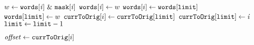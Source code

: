    \item[]
       \label{line:intersect:1}
       \label{line:intersect:2}
        \STATE $w \gets \Words[\localvar{i}] \ \& \ \Mask[\localvar{i}]$  \label{line:intersect:4}
         \label{line:intersect:5}
          \STATE $\texttt{words}[\mathit{i}] \gets w$ \label{line:intersect:6}
           \label{line:intersect:7}
            \STATE $\texttt{words}[i] \gets \texttt{words}[\texttt{limit}]$ \label{line:intersect:7.1}
            \STATE $\texttt{words}[\texttt{limit}] \gets w$ \label{line:intersect:7.2}
            \STATE $\texttt{currToOrig}[i] \gets \texttt{currToOrig}[\texttt{limit}]$ \label{line:intersect:8}
            \STATE $\texttt{currToOrig}[\texttt{limit}] \gets \mathit{i}$ \label{line:intersect:8.5}
            \STATE $\texttt{limit} \gets \texttt{limit} - 1$ \label{line:intersect:9}
          \ENDIF
        \ENDIF
      \EndFor
      \Endfunc

    \item[]
       \label{line:interIdx:1}
       \label{line:interIdx:2}
        \STATE $\mathit{offset} \gets \texttt{currToOrig}[i]$ \label{line:interIdx:4}
         \label{line:interIdx:5}
           \label{line:interIdx:6}
        \ENDIF
      \EndFor
       \label{line:interIdx:7}
      \Endfunc

